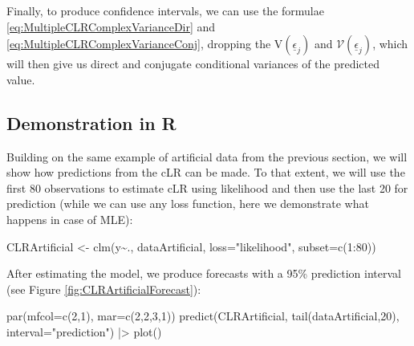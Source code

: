 \documentclass[
]{book}
\newenvironment{Shaded}{\begin{snugshade}}{\end{snugshade}}
\newcommand{\AttributeTok}[1]{\textcolor[rgb]{0.77,0.63,0.00}{#1}}
\newcommand{\DecValTok}[1]{\textcolor[rgb]{0.00,0.00,0.81}{#1}}
\newcommand{\FunctionTok}[1]{\textcolor[rgb]{0.00,0.00,0.00}{#1}}
\newcommand{\NormalTok}[1]{#1}
\newcommand{\OtherTok}[1]{\textcolor[rgb]{0.56,0.35,0.01}{#1}}
\newcommand{\SpecialCharTok}[1]{\textcolor[rgb]{0.00,0.00,0.00}{#1}}
\newcommand{\StringTok}[1]{\textcolor[rgb]{0.31,0.60,0.02}{#1}}
\begin{document}
Finally, to produce confidence intervals, we can use the formulae \eqref{eq:MultipleCLRComplexVarianceDir} and \eqref{eq:MultipleCLRComplexVarianceConj}, dropping the \(\mathrm{V}\left(\underline{\epsilon}_j\right)\) and \(\mathcal{V}\left(\underline{\epsilon}_j\right)\), which will then give us direct and conjugate conditional variances of the predicted value.

\hypertarget{demonstration-in-r-1}{%
\subsection{Demonstration in R}\label{demonstration-in-r-1}}

Building on the same example of artificial data from the previous section, we will show how predictions from the cLR can be made. To that extent, we will use the first 80 observations to estimate cLR using likelihood and then use the last 20 for prediction (while we can use any loss function, here we demonstrate what happens in case of MLE):

\begin{Shaded}
\begin{Highlighting}[]
\NormalTok{CLRArtificial }\OtherTok{\textless{}{-}} \FunctionTok{clm}\NormalTok{(y}\SpecialCharTok{\textasciitilde{}}\NormalTok{., dataArtificial,}
                     \AttributeTok{loss=}\StringTok{"likelihood"}\NormalTok{, }\AttributeTok{subset=}\FunctionTok{c}\NormalTok{(}\DecValTok{1}\SpecialCharTok{:}\DecValTok{80}\NormalTok{))}
\end{Highlighting}
\end{Shaded}

After estimating the model, we produce forecasts with a 95\% prediction interval (see Figure \ref{fig:CLRArtificialForecast}):

\begin{Shaded}
\begin{Highlighting}[]
\FunctionTok{par}\NormalTok{(}\AttributeTok{mfcol=}\FunctionTok{c}\NormalTok{(}\DecValTok{2}\NormalTok{,}\DecValTok{1}\NormalTok{), }\AttributeTok{mar=}\FunctionTok{c}\NormalTok{(}\DecValTok{2}\NormalTok{,}\DecValTok{2}\NormalTok{,}\DecValTok{3}\NormalTok{,}\DecValTok{1}\NormalTok{))}
\FunctionTok{predict}\NormalTok{(CLRArtificial, }\FunctionTok{tail}\NormalTok{(dataArtificial,}\DecValTok{20}\NormalTok{),}
        \AttributeTok{interval=}\StringTok{"prediction"}\NormalTok{) }\SpecialCharTok{|\textgreater{}}
    \FunctionTok{plot}\NormalTok{()}
\end{Highlighting}
\end{Shaded}
\end{document}
